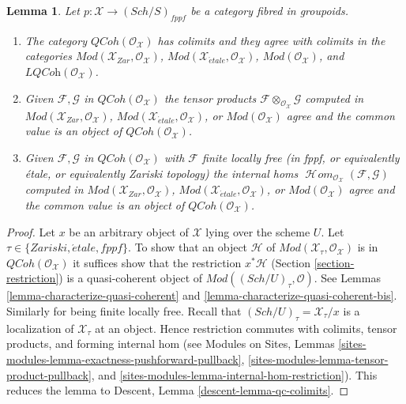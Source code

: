 \documentclass[10pt,a4paper]{amsart}
\theoremstyle{plain}
\newtheorem{lemma}[subsection]{Lemma}
\theoremstyle{definition}
\theoremstyle{remark}
\numberwithin{equation}{subsection}
\def\SheafHom{\mathop{\mathcal{H}\!\mathit{om}}\nolimits}
\def\Sch{\mathit{Sch}}
\def\etale{{\acute{e}tale}}
\def\QCoh{\mathit{QCoh}}
\begin{document}
\begin{lemma}
\label{lemma-qc-colimits}
Let $p : \mathcal{X} \to (\Sch/S)_{fppf}$ be a category
fibred in groupoids.
\begin{enumerate}
\item The category $\QCoh(\mathcal{O}_\mathcal{X})$
has colimits and they agree with colimits in the categories
$\textit{Mod}(\mathcal{X}_{Zar}, \mathcal{O}_\mathcal{X})$,
$\textit{Mod}(\mathcal{X}_\etale, \mathcal{O}_\mathcal{X})$,
$\textit{Mod}(\mathcal{O}_\mathcal{X})$, and
$\textit{LQCoh}(\mathcal{O}_\mathcal{X})$.
\item Given $\mathcal{F}, \mathcal{G}$ in $\QCoh(\mathcal{O}_\mathcal{X})$
the tensor products $\mathcal{F} \otimes_{\mathcal{O}_\mathcal{X}} \mathcal{G}$
computed in $\textit{Mod}(\mathcal{X}_{Zar}, \mathcal{O}_\mathcal{X})$,
$\textit{Mod}(\mathcal{X}_\etale, \mathcal{O}_\mathcal{X})$, or
$\textit{Mod}(\mathcal{O}_\mathcal{X})$ agree and the common value
is an object of $\QCoh(\mathcal{O}_\mathcal{X})$.
\item Given $\mathcal{F}, \mathcal{G}$ in $\QCoh(\mathcal{O}_\mathcal{X})$
with $\mathcal{F}$ finite locally free (in fppf, or equivalently \'etale, or
equivalently Zariski topology) the internal homs
$\SheafHom_{\mathcal{O}_\mathcal{X}}(\mathcal{F}, \mathcal{G})$
computed in $\textit{Mod}(\mathcal{X}_{Zar}, \mathcal{O}_\mathcal{X})$,
$\textit{Mod}(\mathcal{X}_\etale, \mathcal{O}_\mathcal{X})$, or
$\textit{Mod}(\mathcal{O}_\mathcal{X})$ agree and the common value
is an object of $\QCoh(\mathcal{O}_\mathcal{X})$.
\end{enumerate}
\end{lemma}

\begin{proof}
Let $x$ be an arbitrary object of $\mathcal{X}$ lying over the scheme $U$.
Let $\tau \in \{Zariski, \etale, fppf\}$. To show that an object $\mathcal{H}$
of $\textit{Mod}(\mathcal{X}_\tau, \mathcal{O}_\mathcal{X})$ is
in $\QCoh(\mathcal{O}_\mathcal{X})$ it suffices show that the
restriction $x^*\mathcal{H}$ (Section \ref{section-restriction})
is a quasi-coherent object of $\textit{Mod}((\Sch/U)_\tau, \mathcal{O})$.
See Lemmas \ref{lemma-characterize-quasi-coherent} and
\ref{lemma-characterize-quasi-coherent-bis}. Similarly for being
finite locally free. Recall that $(\Sch/U)_\tau = \mathcal{X}_\tau/x$
is a localization of $\mathcal{X}_\tau$ at an object. Hence restriction
commutes with colimits, tensor products, and forming internal hom
(see Modules on Sites, Lemmas
\ref{sites-modules-lemma-exactness-pushforward-pullback},
\ref{sites-modules-lemma-tensor-product-pullback}, and
\ref{sites-modules-lemma-internal-hom-restriction}).
This reduces the lemma to Descent, Lemma \ref{descent-lemma-qc-colimits}.
\end{proof}
\end{document}
